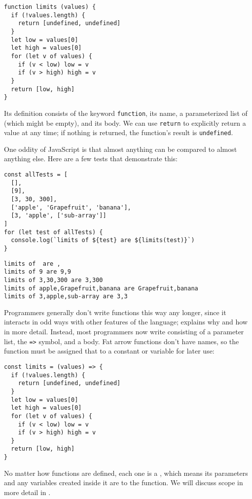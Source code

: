\begin{verbatim}
function limits (values) {
  if (!values.length) {
    return [undefined, undefined]
  }
  let low = values[0]
  let high = values[0]
  for (let v of values) {
    if (v < low) low = v
    if (v > high) high = v
  }
  return [low, high]
}
\end{verbatim}

Its definition consists of the keyword \texttt{function},
its name,
a parameterized list of  (which might be empty),
and its body.
We can use \texttt{return} to explicitly return a value at any time;
if nothing is returned,
the function's result is \texttt{undefined}.

One oddity of JavaScript is that almost anything can be compared to almost anything else.
Here are a few tests that demonstrate this:

\begin{verbatim}
const allTests = [
  [],
  [9],
  [3, 30, 300],
  ['apple', 'Grapefruit', 'banana'],
  [3, 'apple', ['sub-array']]
]
for (let test of allTests) {
  console.log(`limits of ${test} are ${limits(test)}`)
}
\end{verbatim}

\begin{verbatim}
limits of  are ,
limits of 9 are 9,9
limits of 3,30,300 are 3,300
limits of apple,Grapefruit,banana are Grapefruit,banana
limits of 3,apple,sub-array are 3,3
\end{verbatim}

Programmers generally don't write functions this way any longer,
since it interacts in odd ways with other features of the language;
 explains why and how in more detail.
Instead,
most programmers now write 
consisting of a parameter list,
the \texttt{=\textgreater{}} symbol,
and a body.
Fat arrow functions don't have names,
so the function must be assigned that to a constant or variable for later use:

\begin{verbatim}
const limits = (values) => {
  if (!values.length) {
    return [undefined, undefined]
  }
  let low = values[0]
  let high = values[0]
  for (let v of values) {
    if (v < low) low = v
    if (v > high) high = v
  }
  return [low, high]
}
\end{verbatim}

No matter how functions are defined,
each one is a ,
which means its parameters and any variables created inside it are  to the function.
We will discuss scope in more detail in .

